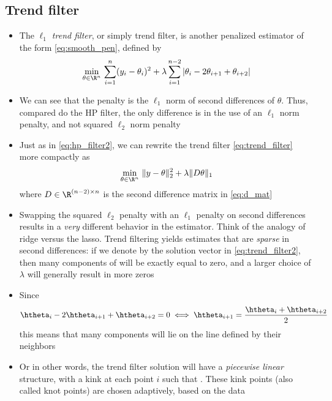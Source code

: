 \documentclass{article}
\begin{document}
\subsection{Trend filter}

\begin{itemize}
\item The \emph{$\ell_1$ trend filter}, or simply trend filter, is another
  penalized estimator of the form \eqref{eq:smooth_pen}, defined by     
  \begin{equation}
  \label{eq:trend_filter} 
  \min_{\theta \in \R^n} \, \sum_{i=1}^n (y_i - \theta_i)^2 + \lambda
  \sum_{i=1}^{n-2} |\theta_i - 2\theta_{i+1} + \theta_{i+2}|
  \end{equation}

\item We can see that the penalty is the $\ell_1$ norm of second differences of
  $\theta$. Thus, compared do the HP filter, the only difference is in the use
  of an $\ell_1$ norm penalty, and not squared $\ell_2$ norm penalty

\item Just as in \eqref{eq:hp_filter2}, we can rewrite the trend filter
  \eqref{eq:trend_filter} more compactly as
  \begin{equation}
  \label{eq:trend_filter2}
  \min_{\theta \in \R^n} \, \|y - \theta\|_2^2 + \lambda \|D \theta\|_1 
  \end{equation}
  where $D \in \R^{(n-2) \times n}$ is the second difference matrix in
  \eqref{eq:d_mat} 

\item Swapping the squared $\ell_2$ penalty with an $\ell_1$ penalty on second
  differences results in a \emph{very} different behavior in the estimator. 
  Think of the analogy of ridge versus the lasso. Trend filtering yields
  estimates that are \emph{sparse} in second differences: if we denote by
  \smash{$\htheta$} the solution vector in \eqref{eq:trend_filter2}, then many
  components of  will be exactly equal to zero, and a larger
  choice of $\lambda$ will generally result in more zeros 

\item Since 
  \[
  \htheta_i - 2\htheta_{i+1} + \htheta_{i+2} = 0 \iff  
  \htheta_{i+1} = \frac{\htheta_i + \htheta_{i+2}}{2} 
  \]
  this means that many components  will lie on the line
  defined by their neighbors

\item Or in other words, the trend filter solution \smash{$\htheta$} will have a
  \emph{piecewise linear} structure, with a kink at each point $i$ such that
  . These kink points
  (also called knot points) are chosen adaptively, based on the data


\end{itemize}
\end{document}
